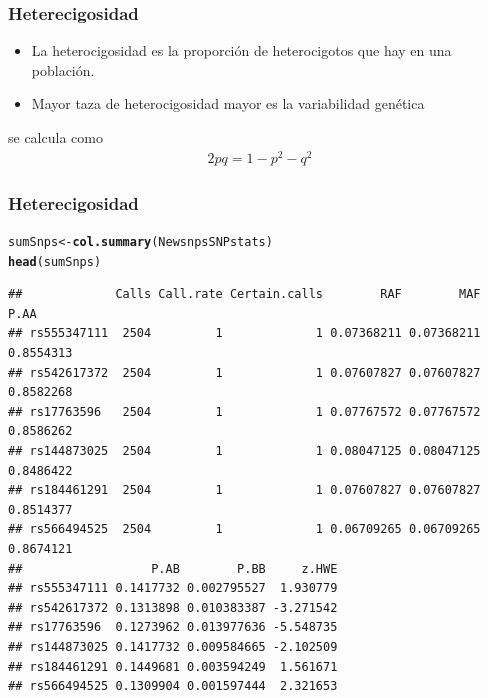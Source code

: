 \documentclass{beamer}\usepackage[]{graphicx}\usepackage[]{color}
\makeatletter
\newcommand{\hlstd}[1]{\textcolor[rgb]{0.345,0.345,0.345}{#1}}%
\newcommand{\hlkwb}[1]{\textcolor[rgb]{0.69,0.353,0.396}{#1}}%
\newcommand{\hlkwd}[1]{\textcolor[rgb]{0.737,0.353,0.396}{\textbf{#1}}}%
\newenvironment{kframe}{%
 \def\at@end@of@kframe{}%
 \ifinner\ifhmode%
  \def\at@end@of@kframe{\end{minipage}}%
  \begin{minipage}{\columnwidth}%
 \fi\fi%
 \def\FrameCommand##1{\hskip\@totalleftmargin \hskip-\fboxsep
 \colorbox{shadecolor}{##1}\hskip-\fboxsep
     \hskip-\linewidth \hskip-\@totalleftmargin \hskip\columnwidth}%
 \MakeFramed {\advance\hsize-\width
   \@totalleftmargin\z@ \linewidth\hsize
   \@setminipage}}%
 {\par\unskip\endMakeFramed%
 \at@end@of@kframe}
\newenvironment{knitrout}{}{} %
\makeatother
\begin{document}
\begin{frame}[fragile]
\frametitle{Heterecigosidad}
\begin{itemize}
\item La heterocigosidad es la proporci\'on de heterocigotos que hay en una poblaci\'on.
\item Mayor taza de heterocigosidad mayor es la variabilidad gen\'etica
\end{itemize}
se calcula como 
\begin{eqnarray}
2pq=1-p^2-q^2
\end{eqnarray}

\end{frame}

\begin{frame}[fragile]
\frametitle{Heterecigosidad}

\begin{knitrout}\footnotesize
{}\color{fgcolor}\begin{kframe}
\begin{alltt}
\hlstd{sumSnps} \hlkwb{<-} \hlkwd{col.summary}\hlstd{(NewsnpsSNPstats)}
\hlkwd{head}\hlstd{(sumSnps)}
\end{alltt}
\begin{verbatim}
##             Calls Call.rate Certain.calls        RAF        MAF      P.AA
## rs555347111  2504         1             1 0.07368211 0.07368211 0.8554313
## rs542617372  2504         1             1 0.07607827 0.07607827 0.8582268
## rs17763596   2504         1             1 0.07767572 0.07767572 0.8586262
## rs144873025  2504         1             1 0.08047125 0.08047125 0.8486422
## rs184461291  2504         1             1 0.07607827 0.07607827 0.8514377
## rs566494525  2504         1             1 0.06709265 0.06709265 0.8674121
##                  P.AB        P.BB     z.HWE
## rs555347111 0.1417732 0.002795527  1.930779
## rs542617372 0.1313898 0.010383387 -3.271542
## rs17763596  0.1273962 0.013977636 -5.548735
## rs144873025 0.1417732 0.009584665 -2.102509
## rs184461291 0.1449681 0.003594249  1.561671
## rs566494525 0.1309904 0.001597444  2.321653
\end{verbatim}
\end{kframe}
\end{knitrout}
\end{frame}
\end{document}
